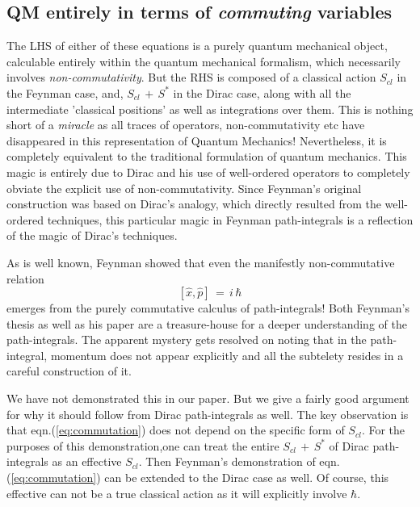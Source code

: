\documentclass[a4paper]{JHEP3}
\newcommand{\be}{\begin{equation}}
\newcommand{\ee}{\end{equation}}
\begin{document}
\subsection{QM entirely in terms of {\it commuting} variables}
The LHS of either of these equations is a purely quantum mechanical object, calculable entirely within the quantum mechanical formalism,
which necessarily involves \emph{non-commutativity}. But the RHS is composed of a classical action $S_{cl}$ in the Feynman case, and,
$S_{cl}\,+\,S^*$ in the Dirac case,  along with all
the intermediate 'classical positions' as well as integrations over them. This is nothing short of a {\it miracle} as all traces of operators,
non-commutativity etc have disappeared in this representation of Quantum Mechanics! Nevertheless, it is completely equivalent to the
traditional formulation of quantum mechanics. This magic is entirely due to Dirac and his use of well-ordered operators to completely
obviate the explicit use of non-commutativity. Since Feynman's original construction was based on Dirac's analogy, which directly resulted
from the well-ordered techniques, this particular magic in Feynman path-integrals is a reflection of the magic of Dirac's techniques.

As is well known, Feynman showed that even the manifestly non-commutative relation
\be
\label{eq:commutation}
[{\hat x},{\hat p}]\,=\,i\,\hbar
\ee
emerges from the purely commutative calculus of path-integrals!
Both Feynman's thesis \cite{thesis} as well as his paper \cite{feynpaper} are a treasure-house for a
deeper understanding of the path-integrals. The apparent mystery gets resolved on noting that in the path-integral, momentum does not
appear explicitly and all the subtelety resides in a careful construction of it.

We have not demonstrated this in our paper. But we give a fairly good argument for why it should follow from Dirac path-integrals
as well. The key observation is that eqn.(\ref{eq:commutation}) does not depend on the specific form of $S_{cl}$. For the purposes
of this demonstration,one can treat the entire $S_{cl}\,+\,S^*$ of Dirac path-integrals as an effective $S_{cl}$. Then Feynman's
demonstration of eqn.(\ref{eq:commutation}) can be extended to the Dirac case as well. Of course, this effective can not be a true
classical action as it will explicitly involve $\hbar$.
 
\end{document}
